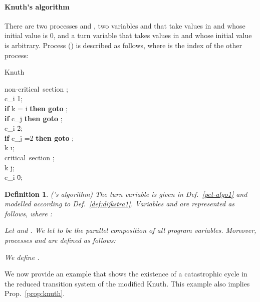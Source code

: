 \documentclass[copyright,creativecommons]{eptcs}
\newtheorem{definition}[theorem]{Definition}
\newcommand{\knutha}{{\sf Knuth}} \newcommand{\knuthb}{\knutha}
\begin{document}
\paragraph{Knuth's algorithm}
There are two processes  and , two variables  and
 that take values in  and whose initial value is 0, and a
turn variable  that takes values in 
and whose initial value is arbitrary.  Process  () is
described as follows, where  is the index of the other process:
\begin{algorithm}{Knuth}{}
\begin{WHILE}{}
\langle \mbox{non-critical section} \rangle; \\
c_i \= 1;\\
{\bf if} \; k = i  \; {\bf then \; goto} ;\\
\; {\bf if} \; c_j    \; {\bf then \; goto} ;\\
c_i \= 2;\\
{\bf if} \; c_j =2  \; {\bf then \; goto} ;\\
k \= i;\\
\langle \mbox{critical section} \rangle; \\
k \= j; \\
c_i \= 0;
\end{WHILE}
\end{algorithm}
\begin{definition}\rm\label{def:knuth1} ({\it 's algorithm}) 
The turn variable  is given in Def.~\ref{pet-algo1} and modelled according to Def.~\ref{def:dijkstra1}. Variables 
and  are represented as follows, where :

\vspace{0.1cm}
\hspace{3.5cm}


\vspace{0.15cm}

\noindent Let    and . We
let  to be the parallel composition of all program
variables. Moreover, processes  and  are defined as
follows: 

\vspace{0.1cm}

\hspace{1.5cm}


\hspace{1.5cm}


\noindent We define . 
\end{definition}
We now provide an example that shows the existence of a catastrophic cycle
in the reduced transition system of the modified \knutha. This example also
implies Prop.~\ref{prop:knuth}.
\end{document}
